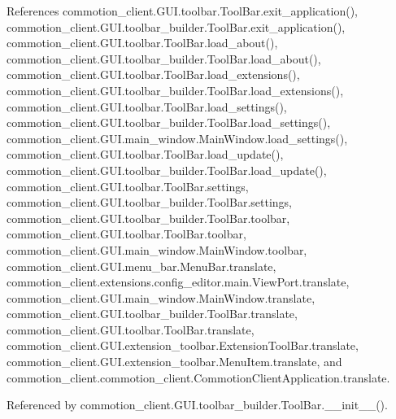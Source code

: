 References commotion\-\_\-client.\-G\-U\-I.\-toolbar.\-Tool\-Bar.\-exit\-\_\-application(), commotion\-\_\-client.\-G\-U\-I.\-toolbar\-\_\-builder.\-Tool\-Bar.\-exit\-\_\-application(), commotion\-\_\-client.\-G\-U\-I.\-toolbar.\-Tool\-Bar.\-load\-\_\-about(), commotion\-\_\-client.\-G\-U\-I.\-toolbar\-\_\-builder.\-Tool\-Bar.\-load\-\_\-about(), commotion\-\_\-client.\-G\-U\-I.\-toolbar.\-Tool\-Bar.\-load\-\_\-extensions(), commotion\-\_\-client.\-G\-U\-I.\-toolbar\-\_\-builder.\-Tool\-Bar.\-load\-\_\-extensions(), commotion\-\_\-client.\-G\-U\-I.\-toolbar.\-Tool\-Bar.\-load\-\_\-settings(), commotion\-\_\-client.\-G\-U\-I.\-toolbar\-\_\-builder.\-Tool\-Bar.\-load\-\_\-settings(), commotion\-\_\-client.\-G\-U\-I.\-main\-\_\-window.\-Main\-Window.\-load\-\_\-settings(), commotion\-\_\-client.\-G\-U\-I.\-toolbar.\-Tool\-Bar.\-load\-\_\-update(), commotion\-\_\-client.\-G\-U\-I.\-toolbar\-\_\-builder.\-Tool\-Bar.\-load\-\_\-update(), commotion\-\_\-client.\-G\-U\-I.\-toolbar.\-Tool\-Bar.\-settings, commotion\-\_\-client.\-G\-U\-I.\-toolbar\-\_\-builder.\-Tool\-Bar.\-settings, commotion\-\_\-client.\-G\-U\-I.\-toolbar\-\_\-builder.\-Tool\-Bar.\-toolbar, commotion\-\_\-client.\-G\-U\-I.\-toolbar.\-Tool\-Bar.\-toolbar, commotion\-\_\-client.\-G\-U\-I.\-main\-\_\-window.\-Main\-Window.\-toolbar, commotion\-\_\-client.\-G\-U\-I.\-menu\-\_\-bar.\-Menu\-Bar.\-translate, commotion\-\_\-client.\-extensions.\-config\-\_\-editor.\-main.\-View\-Port.\-translate, commotion\-\_\-client.\-G\-U\-I.\-main\-\_\-window.\-Main\-Window.\-translate, commotion\-\_\-client.\-G\-U\-I.\-toolbar\-\_\-builder.\-Tool\-Bar.\-translate, commotion\-\_\-client.\-G\-U\-I.\-toolbar.\-Tool\-Bar.\-translate, commotion\-\_\-client.\-G\-U\-I.\-extension\-\_\-toolbar.\-Extension\-Tool\-Bar.\-translate, commotion\-\_\-client.\-G\-U\-I.\-extension\-\_\-toolbar.\-Menu\-Item.\-translate, and commotion\-\_\-client.\-commotion\-\_\-client.\-Commotion\-Client\-Application.\-translate.



Referenced by commotion\-\_\-client.\-G\-U\-I.\-toolbar\-\_\-builder.\-Tool\-Bar.\-\_\-\-\_\-init\-\_\-\-\_\-().


